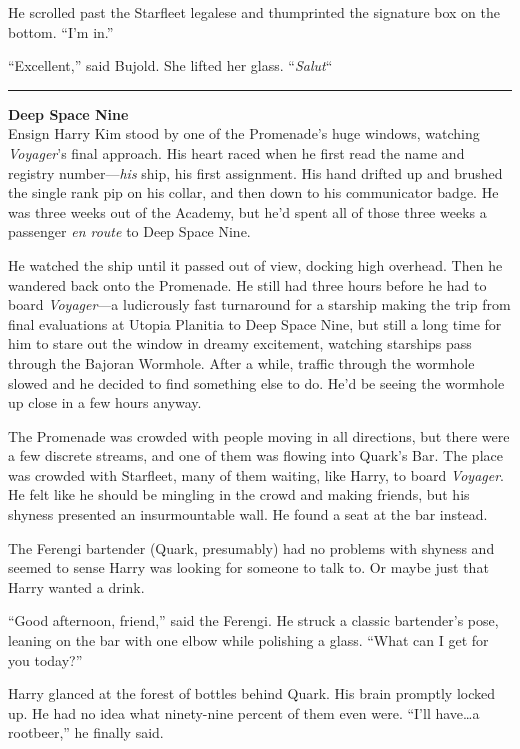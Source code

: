 \documentclass[twoside,letterpaper,12pt]{memoir}
\begin{document}
He scrolled past the Starfleet legalese and thumprinted the signature box on the bottom. ``I'm in.''

``Excellent,'' said Bujold. She lifted her glass. ``\textit{Salut}``

\fancybreak{\rule{3cm}{0.4 pt}}
\noindent\textbf{Deep Space Nine}\\

Ensign Harry Kim stood by one of the Promenade's huge windows, watching \textit{Voyager}'s final approach. His heart raced when he first read the name and registry number---\textit{his} ship, his first assignment. His hand drifted up and brushed the single rank pip on his collar, and then down to his communicator badge. He was three weeks out of the Academy, but he'd spent all of those three weeks a passenger \textit{en route} to Deep Space Nine.

He watched the ship until it passed out of view, docking high overhead. Then he wandered back onto the Promenade. He still had three hours before he had to board \textit{Voyager}---a ludicrously fast turnaround for a starship making the trip from final evaluations at Utopia Planitia to Deep Space Nine, but still a long time for him to stare out the window in dreamy excitement, watching starships pass through the Bajoran Wormhole. After a while, traffic through the wormhole slowed and he decided to find something else to do. He'd be seeing the wormhole up close in a few hours anyway.

The Promenade was crowded with people moving in all directions, but there were a few discrete streams, and one of them was flowing into Quark's Bar. The place was crowded with Starfleet, many of them waiting, like Harry, to board \textit{Voyager}. He felt like he should be mingling in the crowd and making friends, but his shyness presented an insurmountable wall. He found a seat at the bar instead.

The Ferengi bartender (Quark, presumably) had no problems with shyness and seemed to sense Harry was looking for someone to talk to. Or maybe just that Harry wanted a drink.

``Good afternoon, friend,'' said the Ferengi. He struck a classic bartender's pose, leaning on the bar with one elbow while polishing a glass. ``What can I get for you today?''

Harry glanced at the forest of bottles behind Quark. His brain promptly locked up. He had no idea what ninety-nine percent of them even were. ``I'll have\ldots a rootbeer,'' he finally said.
\end{document}
